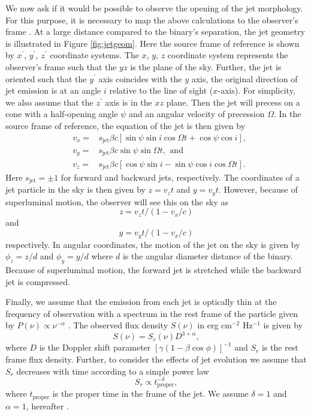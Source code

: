 \documentclass[a4paper,fleqn,usenatbib]{mnras}
\begin{document}
We now ask if it would be possible to observe the opening of the jet
morphology.  For this purpose, it is necessary to map the above
calculations to the observer's frame \citep{1982ApJ...262..478G}.  At
a large distance compared to the binary's separation, the jet geometry
is illustrated in Figure \ref{fig:jetgeom}.  Here the source frame of
reference is shown by $x^\prime$, $y^\prime$, $z^\prime$ coordinate
systems.  The $x$, $y$, $z$ coordinate system represents the
observer's frame such that the $yz$ is the plane of the sky.  Further,
the jet is oriented such that the $y^\prime$ axis coincides with the
$y$ axis, the original direction of jet emission is at an angle $i$
relative to the line of sight ($x$-axis).  For simplicity, we also
assume that the $z^\prime$ axis is in the $xz$ plane.  Then the jet
will precess on a cone with a half-opening angle $\psi$ and an angular
velocity of precession $\Omega$.  In the source frame of reference,
the equation of the jet is then given by \citep{1981ApJ...246L.141H}
\begin{eqnarray}
  &v_x=&s_\mathrm{jet}\beta c\left[\sin\psi\sin i\cos\Omega t+\cos\psi\cos i\right],\\
  &v_y=&s_\mathrm{jet}\beta c\sin\psi\sin\Omega t,~\,\mathrm{and}\\
  &v_z=&s_\mathrm{jet}\beta c\left[\cos\psi\sin i-\sin\psi\cos i\cos\Omega t\right]. 
\end{eqnarray}
Here $s_\mathrm{jet}=\pm 1$ for forward and backward jets,
respectively.  The coordinates of a jet particle in the sky is then
given by $z=v_zt$ and $y=v_yt$.  However, because of superluminal
motion, the observer will see this on the sky as
\begin{equation}
  z=v_zt/(1-v_x/c)
\end{equation}
and
\begin{equation}
  y=v_yt/(1-v_x/c)
\end{equation}
respectively.  In angular coordinates, the motion of the jet on the
sky is given by $\phi_z=z/d$ and $\phi_y=y/d$ where $d$ is the angular
diameter distance of the binary.  Because of superluminal motion, the
forward jet is stretched while the backward jet is compressed.

Finally, we assume that the emission from each jet is optically thin
at the frequency of observation with a spectrum in the rest frame of
the particle given by $P(\nu)\propto \nu^{-\alpha}$
\citep{1982ApJ...262..478G}.  The observed flux density $S(\nu)$ in
erg cm$^{-2}$ Hz$^{-1}$ is given by
\begin{equation}
  S(\nu)=S_r(\nu)D^{3+\alpha},
\end{equation}
where $D$ is the Doppler shift parameter
$[\gamma(1-\beta\cos\phi)]^{-1}$ and $S_r$ is the rest frame flux
density.  Further, to consider the effects of jet evolution we assume
that $S_r$ decreases with time according to a simple power law
\begin{equation}
  S_r\propto t_\mathrm{proper}^{-\delta},
\end{equation}
where $t_\mathrm{proper}$ is the proper time in the frame of the jet.
We assume $\delta=1$ and $\alpha=1$, hereafter
\citep{1982ApJ...262..478G}.
\end{document}
